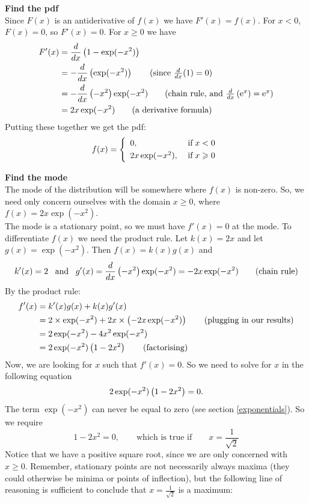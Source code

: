 \noindent \textbf{Find the pdf} \\
Since $F(x)$ is an antiderivative of $f(x)$ we have $F'(x) = f(x)$. For $x < 0$, $F(x) = 0$, so $F'(x) = 0$. For $x \geq 0$ we have
\begin{align*}
F'(x) & = \frac{d}{dx}\brac{1 - \exp(-x^2)}  \\
	& = - \frac{d}{dx}\brac{\exp(-x^2)} \tag{since $\frac{d}{dx}(1) = 0$} \\
	& = -\frac{d}{dx}\brac{-x^2}\exp(-x^2)  \tag{chain rule, and $\frac{d}{dx}\brac{\e^x} = \e^x$} \\
	& = 2x\exp(-x^2) \tag{a derivative formula}
\end{align*}
Putting these together we get the pdf:
\[
	f(x) = \left\{
	\begin{array}{ll}
	0, & \; \text{if} \; x < 0 \smallskip \\
	2x\exp(-x^2), & \; \text{if} \; x \geq 0
	\end{array}
	\right.
\]

\noindent \textbf{Find the mode} \\
The mode of the distribution will be somewhere where $f(x)$ is non-zero. So, we need only concern ourselves with the domain $x \geq 0$, where $f(x) = 2x\exp(-x^2)$. \\

\noindent The mode is a stationary point, so we must have $f'(x) = 0$ at the mode. To differentiate $f(x)$ we need the product rule. Let $k(x) = 2x$ and let $g(x) = \exp(-x^2)$. Then $f(x) = k(x)g(x)$ and
\[
k'(x) = 2 \;\;\; \text{and} \;\;\; g'(x) = \frac{d}{dx}\left(-x^2\right)\exp(-x^2) = -2x\exp(-x^2) \tag{chain rule}
\]
By the product rule:
\begin{align*}
f'(x)  & = k'(x)g(x) + k(x)g'(x) \\
	& = 2\times\exp(-x^2) + 2x\times\left(-2x\exp(-x^2)\right) \tag{plugging in our results} \\
	& = 2\exp(-x^2) -4x^2\exp(-x^2) \\
	& = 2\exp(-x^2)\left(1 - 2x^2\right) \tag{factorising}
\end{align*}
Now, we are looking for $x$ such that $f'(x) = 0$. So we need to solve for $x$ in the following equation
\[
2\exp(-x^2)\left(1-2x^2\right) = 0.
\]
The term $\exp(-x^2)$ can never be equal to zero (see section \ref{exponentials}). So we require
\[
1-2x^2 = 0, \qquad \text{which is true if} \qquad x = \frac{1}{\sqrt{2}} \tag{solving for $x$}
\]
Notice that we have a positive square root, since we are only concerned with $x \geq 0$. Remember, stationary points are not necessarily always maxima (they could otherwise be minima or points of inflection), but the following line of reasoning is sufficient to conclude that $x = \frac{1}{\sqrt{2}}$ is a maximum: \\


